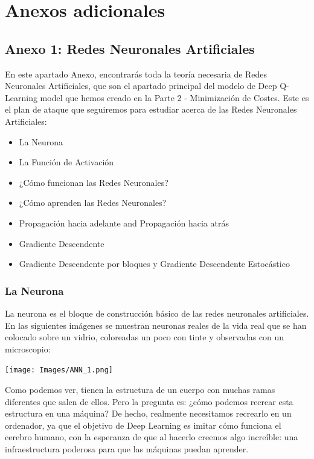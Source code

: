 \documentclass[
]{book}
\providecommand{\tightlist}{%
  \setlength{\itemsep}{0pt}\setlength{\parskip}{0pt}}
\begin{document}
\hypertarget{anexos-adicionales}{%
\chapter{Anexos adicionales}\label{anexos-adicionales}}

\hypertarget{anexo-1-redes-neuronales-artificiales}{%
\section{Anexo 1: Redes Neuronales Artificiales}\label{anexo-1-redes-neuronales-artificiales}}

En este apartado Anexo, encontrarás toda la teoría necesaria de Redes Neuronales Artificiales, que son el apartado principal del modelo de Deep Q-Learning model que hemos creado en la Parte 2 - Minimización de Costes. Este es el plan de ataque que seguiremos para estudiar acerca de las Redes Neuronales Artificiales:

\begin{itemize}
\tightlist
\item
  La Neurona
\item
  La Función de Activación
\item
  ¿Cómo funcionan las Redes Neuronales?
\item
  ¿Cómo aprenden las Redes Neuronales?
\item
  Propagación hacia adelante and Propagación hacia atrás
\item
  Gradiente Descendente
\item
  Gradiente Descendente por bloques y Gradiente Descendente Estocástico
\end{itemize}

\hypertarget{la-neurona}{%
\subsection{La Neurona}\label{la-neurona}}

La neurona es el bloque de construcción básico de las redes neuronales artificiales. En las siguientes imágenes se muestran neuronas reales de la vida real que se han colocado sobre un vidrio, coloreadas un poco con tinte y observadas con un microscopio:

\texttt{[image: Images/ANN\_1.png]}

Como podemos ver, tienen la estructura de un cuerpo con muchas ramas diferentes que salen de ellos. Pero la pregunta es: ¿cómo podemos recrear esta estructura en una máquina? De hecho, realmente necesitamos recrearlo en un ordenador, ya que el objetivo de Deep Learning es imitar cómo funciona el cerebro humano, con la esperanza de que al hacerlo creemos algo increíble: una infraestructura poderosa para que las máquinas puedan aprender.
\end{document}
